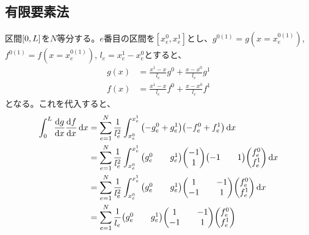 \documentclass[xelatex,ja=standard]{bxjsarticle}
\begin{document}
\subsection{有限要素法}
区間$\qty[0,L]$を$N$等分する。$e$番目の区間を$[x_e^0,x_e^1]$とし、$g^{0(1)} = g(x=x_e^{0(1)})$, $f^{0(1)} = f(x=x_e^{0(1)})$, $l_e = x_e^1 - x_e^0$とすると、
\begin{align}
    g(x) &= \frac{x^1 - x}{l_e}g^0 + \frac{x-x^0}{l_e}g^1\\
    f(x) &= \frac{x^1 - x}{l_e}f^0 + \frac{x-x^0}{l_e}f^1
\end{align}
となる。これを代入すると、
\begin{align}
    \int_0^L \dv{g}{x}\dv{f}{x}\dd{x} 
    &= \sum_{e=1}^N \frac{1}{l_e^2}\int_{x_e^0}^{x_e^1}\qty(-g_e^0 + g_e^1)\qty(-f_e^0 + f_e^1)\dd{x}\notag\\
    &= \sum_{e=1}^N \frac{1}{l_e^2}\int_{x_e^0}^{x_e^1}\mqty(g_e^0 && g_e^1)\mqty(-1\\1)\mqty(-1 && 1)\mqty(f_e^0 \\ f_e^1)\dd{x}\notag\\
    &= \sum_{e=1}^N \frac{1}{l_e^2}\int_{x_e^0}^{x_e^1}\mqty(g_e^0 && g_e^1)\mqty(1 && -1 \\ -1 && 1)\mqty(f_e^0 \\ f_e^1)\dd{x}\notag\\
    &= \sum_{e=1}^N \frac{1}{l_e}\mqty(g_e^0 && g_e^1)\mqty(1 && -1 \\ -1 && 1)\mqty(f_e^0 \\ f_e^1)\notag\\
\end{align}
\end{document}
